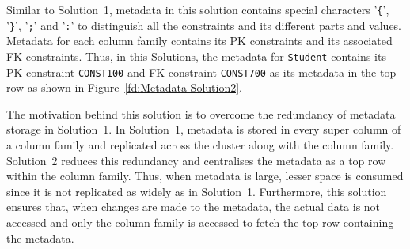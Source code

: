 Similar to Solution~1,   metadata in this solution contains special characters
'\texttt{\{}',  '\texttt{\}}', '\texttt{;}' and '\texttt{:}' to distinguish all
the constraints and its different parts and values.  Metadata  for each
column family contains its \ac{PK} constraints and its associated \ac{FK}
constraints. Thus,  in this Solutions, 
the metadata for \texttt{Student}  contains its \ac{PK} constraint
\texttt{CONST100} and \ac{FK} constraint \texttt{CONST700} as its metadata in
the top row as shown in Figure~\ref{fd:Metadata-Solution2}. 


% 
	
The motivation behind this solution is to overcome the redundancy of metadata
storage in Solution~1.  In Solution~1,  metadata is stored in every super column
of a column family and replicated across the cluster along with the column
family.  Solution~2 reduces this redundancy and centralises the metadata as a top
row within the column family.  Thus,  when metadata is large, lesser space is
consumed since it is not replicated as widely as in Solution~1. 
Furthermore,  this solution  ensures that, when changes are made to the
metadata, the actual data is not accessed and only the
column family  is accessed to fetch the top row containing the metadata. 










